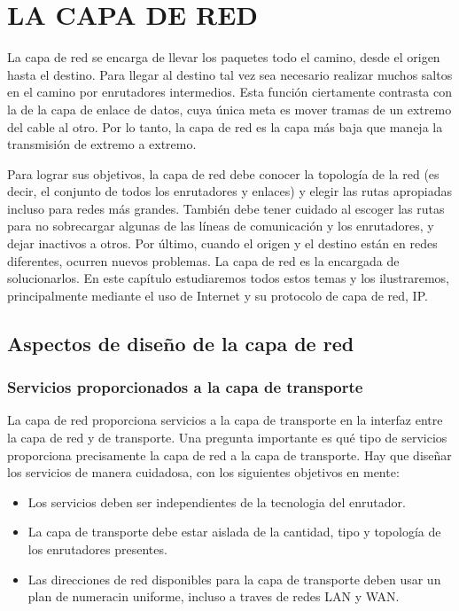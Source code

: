 \documentclass[10pt,a4paper]{report}
\begin{document}
\chapter{LA CAPA DE RED}

	\par La capa de red se encarga de llevar los paquetes todo el camino, desde el origen hasta el destino. Para llegar al destino tal vez sea necesario realizar muchos saltos en el camino por enrutadores intermedios. Esta función ciertamente contrasta con la de la capa de enlace de datos, cuya única meta es mover tramas de un extremo del cable al otro. Por lo tanto, la capa de red es la capa más baja que maneja la transmisión de extremo a extremo.

	\par Para lograr sus objetivos, la capa de red debe conocer la topología de la red (es
decir, el conjunto de todos los enrutadores y enlaces) y elegir las rutas apropiadas
incluso para redes más grandes. También debe tener cuidado al escoger las rutas para
no sobrecargar algunas de las líneas de comunicación y los enrutadores, y dejar
inactivos a otros. Por último, cuando el origen y el destino están en redes diferentes, ocurren nuevos problemas. La capa de red es la encargada de solucionarlos. En este capítulo estudiaremos todos estos temas y los ilustraremos, principalmente mediante el uso de Internet y su protocolo de capa de red, IP.

\section{Aspectos de diseño de la capa de red}

	\subsection{Servicios proporcionados a la capa de transporte}

		\par La capa de red proporciona servicios a la capa de transporte en la interfaz entre la 
capa de red y de transporte. Una pregunta importante es qué tipo de servicios 
proporciona precisamente la capa de red a la capa de transporte. Hay que diseñar los 
servicios de manera cuidadosa, con los siguientes objetivos en mente:
	\begin{itemize}
		\item Los servicios deben ser independientes de la tecnologia del 			
		enrutador.
		\item La capa de transporte debe estar aislada de la cantidad, tipo y topología 
		de los enrutadores presentes.
		\item Las direcciones de red disponibles para la capa de transporte deben usar 
		un plan de numeracin uniforme, incluso a traves de redes LAN y WAN.
	\end{itemize}
	
\end{document}
